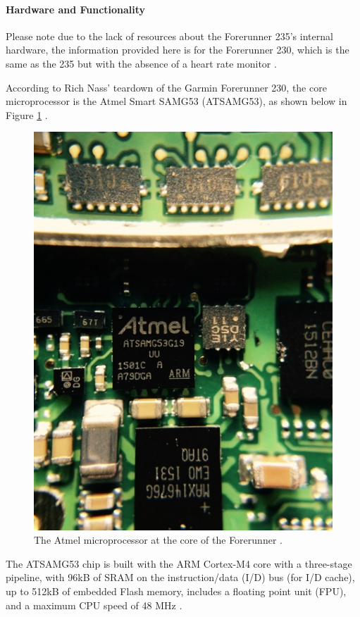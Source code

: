 \paragraph{Hardware and Functionality}
Please note due to the lack of resources about the Forerunner 235's internal hardware,
the information provided here is for the Forerunner 230, which is the same as the 235
but with the absence of a heart rate monitor \cite{forerunner230235}.

According to Rich Nass' teardown of the Garmin Forerunner 230, the core microprocessor
is the Atmel Smart SAMG53 (ATSAMG53), as shown below in Figure \ref{fig:garmTear} \cite{forerunner_teardown}.

\begin{figure}[h]
    \centering
    \includegraphics[scale=0.6]{media/garmin_teardown.jpg}
    \caption{The Atmel microprocessor at the core of the Forerunner \cite{forerunner_teardown}.}
    \label{fig:garmTear}
\end{figure}

The ATSAMG53 chip is built with the ARM Cortex-M4 core with a three-stage pipeline,
with 96kB of SRAM on the instruction/data (I/D) bus (for I/D cache), 
up to 512kB of embedded Flash memory, includes a floating point unit 
(FPU), and a maximum CPU speed of 48 MHz \cite{atmel_specs}.


